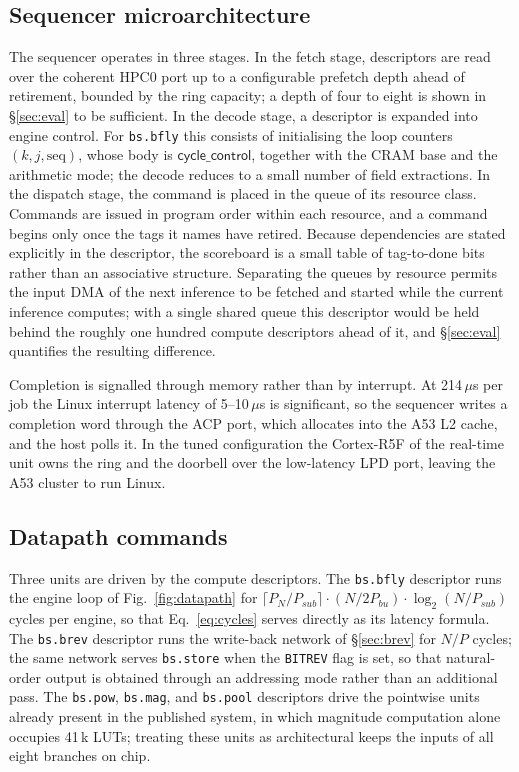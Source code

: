 \documentclass[twocolumn,10pt]{article}
\newcommand{\Pbu}{P_{bu}}
\newcommand{\Psub}{P_{sub}}
\newcommand{\PN}{P_{N}}
\newcommand{\op}[1]{\texttt{#1}}
\begin{document}
\subsection{Sequencer microarchitecture}
The sequencer operates in three stages.  In the fetch stage, descriptors are
read over the coherent HPC0 port up to a configurable prefetch depth ahead of
retirement, bounded by the ring capacity; a depth of four to eight is shown in
\S\ref{sec:eval} to be sufficient.  In the decode stage, a descriptor is
expanded into engine control.  For \op{bs.bfly} this consists of initialising
the loop counters $(k, j, \text{seq})$, whose body is
$\mathsf{cycle\_control}$, together with the CRAM base and the arithmetic mode;
the decode reduces to a small number of field extractions.  In the dispatch
stage, the command is placed in the queue of its resource class.  Commands are
issued in program order within each resource, and a command begins only once the
tags it names have retired.  Because dependencies are stated explicitly in the
descriptor, the scoreboard is a small table of tag-to-done bits rather than an
associative structure.  Separating the queues by resource permits the input DMA
of the next inference to be fetched and started while the current inference
computes; with a single shared queue this descriptor would be held behind the
roughly one hundred compute descriptors ahead of it, and \S\ref{sec:eval}
quantifies the resulting difference.

Completion is signalled through memory rather than by interrupt.  At 214\,$\mu$s
per job the Linux interrupt latency of 5--10\,$\mu$s is significant, so the
sequencer writes a completion word through the ACP port, which allocates into
the A53 L2 cache, and the host polls it.  In the tuned configuration the
Cortex-R5F of the real-time unit owns the ring and the doorbell over the
low-latency LPD port, leaving the A53 cluster to run Linux.

\subsection{Datapath commands}
Three units are driven by the compute descriptors.  The \op{bs.bfly} descriptor
runs the engine loop of Fig.~\ref{fig:datapath} for
$\lceil \PN/\Psub \rceil \cdot (N/2\Pbu) \cdot \log_2(N/\Psub)$ cycles per
engine, so that Eq.~\ref{eq:cycles} serves directly as its latency formula.  The
\op{bs.brev} descriptor runs the write-back network of \S\ref{sec:brev} for
$N/P$ cycles; the same network serves \op{bs.store} when the \texttt{BITREV}
flag is set, so that natural-order output is obtained through an addressing mode
rather than an additional pass.  The \op{bs.pow}, \op{bs.mag}, and \op{bs.pool}
descriptors drive the pointwise units already present in the published system,
in which magnitude computation alone occupies 41\,k LUTs; treating these units
as architectural keeps the inputs of all eight branches on chip.
\end{document}
